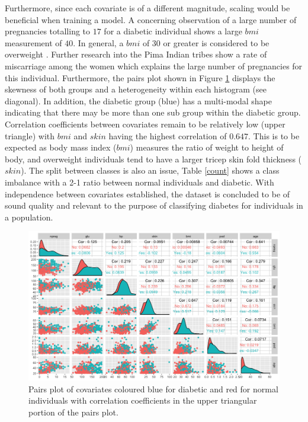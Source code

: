 \documentclass[11pt,letterpaper]{article}
\begin{document}
Furthermore, since each covariate is of a different magnitude, scaling would be beneficial when training a model. 
A concerning observation of a large number of pregnancies totalling to $17$ for a diabetic individual shows a large $bmi$ measurement of $40$. In general, a $bmi$ of 30 or greater is considered to be overweight \citep{diabetes}. Further research into the Pima Indian tribes show a rate of miscarriage among the women which explains the large number of pregnancies for this individual. 
Furthermore, the pairs plot shown in Figure \ref{pairsPlot} displays the skewness of both groups and a heterogeneity within each histogram (see diagonal). In addition, the diabetic group (blue) has a multi-modal shape indicating that there may be more than one sub group within the diabetic group. Correlation coefficients between covariates remain to be relatively low (upper triangle) with $bmi$ and $skin$ having the highest correlation of $0.647$. This is to be expected as body mass index ($bmi$) measures the ratio of weight to height of body, and overweight individuals tend to have a larger tricep skin fold thickness ($skin$). The split between classes is also an issue, Table \ref{count} shows a class imbalance with a 2-1 ratio between normal individuals and diabetic.  
 With independence between covariates established, the dataset is concluded to be of sound quality and relevant to the purpose of classifying diabetes for individuals in a population. 

\begin{figure}
\label{pairsPlot}
\caption{Pairs plot of covariates coloured blue for diabetic and red for normal individuals with correlation coefficients in the upper triangular portion of the pairs plot.}
\includegraphics[scale=0.50]{plotgg}
\end{figure}
\end{document}
